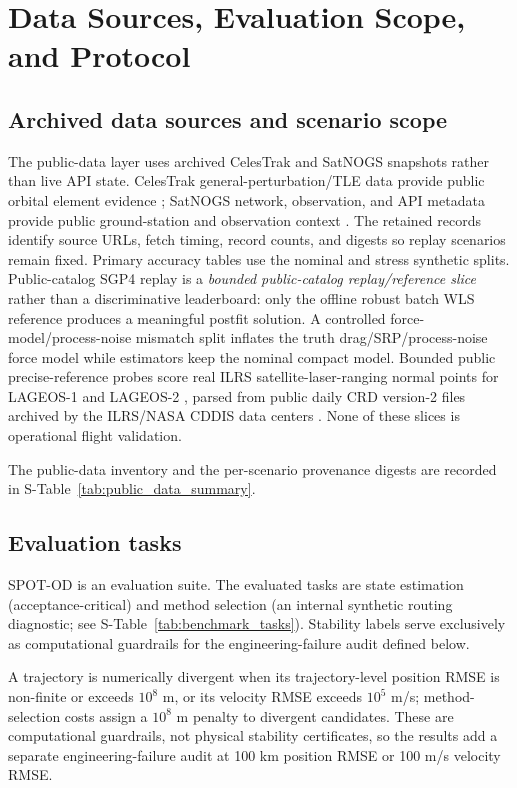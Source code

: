 \documentclass{article}
\begin{document}
\section{Data Sources, Evaluation Scope, and Protocol}
\subsection{Archived data sources and scenario scope}
The public-data layer uses archived CelesTrak and SatNOGS snapshots rather than live API state. CelesTrak general-perturbation/TLE data provide public orbital element evidence \cite{celestrak_gp}; SatNOGS network, observation, and API metadata provide public ground-station and observation context \cite{satnogs_network,satnogs_observations,satnogs_api}. The retained records identify source URLs, fetch timing, record counts, and digests so replay scenarios remain fixed. Primary accuracy tables use the nominal and stress synthetic splits. Public-catalog SGP4 replay is a \emph{bounded public-catalog replay/reference slice} rather than a discriminative leaderboard: only the offline robust batch WLS reference produces a meaningful postfit solution. A controlled force-model/process-noise mismatch split inflates the truth drag/SRP/process-noise force model while estimators keep the nominal compact model. Bounded public precise-reference probes score real ILRS satellite-laser-ranging normal points for LAGEOS-1 and LAGEOS-2 \cite{pearlman2002ilrs,ilrs_npt_data}, parsed from public daily CRD version-2 files \cite{ilrs_crd_format} archived by the ILRS/NASA CDDIS data centers \cite{cddis_slr_npt}. None of these slices is operational flight validation.

The public-data inventory and the per-scenario provenance digests are recorded in S-Table~\ref{tab:public_data_summary}.

\subsection{Evaluation tasks}
SPOT-OD is an evaluation suite. The evaluated tasks are state estimation (acceptance-critical) and method selection (an internal synthetic routing diagnostic; see S-Table~\ref{tab:benchmark_tasks}). Stability labels serve exclusively as computational guardrails for the engineering-failure audit defined below.

A trajectory is numerically divergent when its trajectory-level position RMSE is non-finite or exceeds \(10^8\) m, or its velocity RMSE exceeds \(10^5\) m/s; method-selection costs assign a \(10^8\) m penalty to divergent candidates. These are computational guardrails, not physical stability certificates, so the results add a separate engineering-failure audit at 100 km position RMSE or 100 m/s velocity RMSE.
\end{document}
